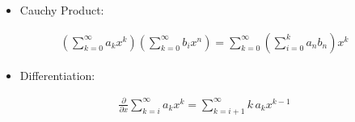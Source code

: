 \begin{itemize}
\tightlist
\item
  Cauchy Product:
\end{itemize}

\begin{align*}
\left( \sum_{k=0}^\infty a_k x^k \right)\left( \sum_{k=0}^\infty b_i x^n \right) = \sum_{k=0}^\infty \left( \sum_{i=0}^k a_{n} b_{n} \right)x^k
\end{align*}

\begin{itemize}
\tightlist
\item
  Differentiation:
\end{itemize}

\begin{align*}
\frac{\partial}{\partial x} \sum_{k=i}^\infty a_kx^k = \sum_{k=i+1}^\infty k\,a_k x^{k-1}
\end{align*}

